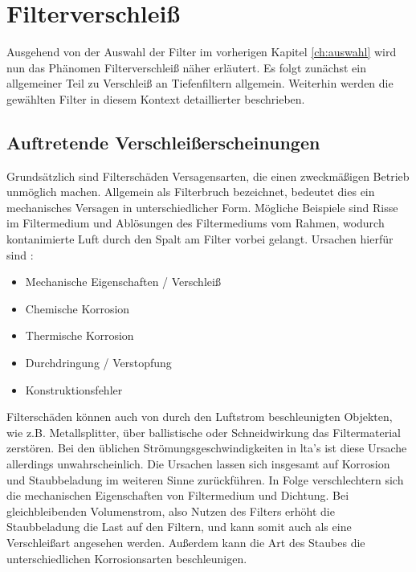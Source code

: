 \chapter{Filterverschleiß}
\label{ch:Filterverschleiß}
Ausgehend von der Auswahl der Filter im vorherigen Kapitel \ref{ch:auswahl} wird nun das Phänomen Filterverschleiß näher erläutert. Es folgt zunächst ein allgemeiner Teil zu Verschleiß an Tiefenfiltern allgemein. Weiterhin werden die gewählten Filter in diesem Kontext detaillierter beschrieben.
\section{Auftretende Verschleißerscheinungen}
\label{sec:auftr}
    Grundsätzlich sind Filterschäden Versagensarten, die einen zweckmäßigen Betrieb unmöglich machen. Allgemein als Filterbruch bezeichnet, bedeutet dies ein mechanisches Versagen in unterschiedlicher Form. Mögliche Beispiele sind Risse im Filtermedium und Ablösungen des Filtermediums vom Rahmen, wodurch kontanimierte Luft durch den Spalt am Filter vorbei gelangt. Ursachen hierfür sind \cite{filterfail}:
    \begin{itemize}
        \item Mechanische Eigenschaften / Verschleiß
        \item Chemische Korrosion
        \item Thermische Korrosion
        \item Durchdringung / Verstopfung
        \item Konstruktionsfehler
    \end{itemize}
    Filterschäden können auch von durch den Luftstrom beschleunigten Objekten, wie z.B. Metallsplitter, über ballistische oder Schneidwirkung das Filtermaterial zerstören. 
    Bei den üblichen Strömungsgeschwindigkeiten in \ac{lta}'s ist diese Ursache allerdings unwahrscheinlich. Die Ursachen lassen sich insgesamt auf Korrosion und Staubbeladung im weiteren Sinne zurückführen. In Folge verschlechtern sich die mechanischen Eigenschaften von Filtermedium und Dichtung. Bei gleichbleibenden Volumenstrom, also Nutzen des Filters erhöht die Staubbeladung die Last auf den Filtern, und kann somit auch als eine Verschleißart angesehen werden. Außerdem kann die Art des Staubes die unterschiedlichen Korrosionsarten beschleunigen.
